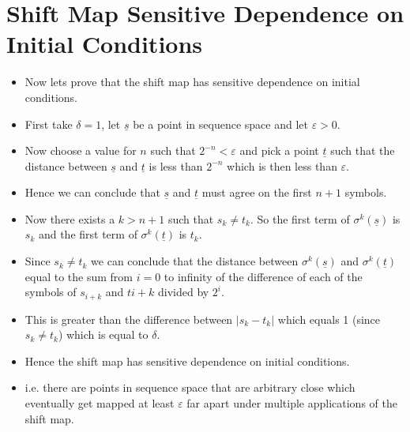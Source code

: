 \documentclass{article}
\begin{document}
    \section{Shift Map Sensitive Dependence on Initial Conditions}
    \begin{itemize}
        \item Now lets prove that the shift map has sensitive dependence on initial conditions.
        \item First take $\delta = 1$, let $\underline{s}$ be a point in sequence space and let $\varepsilon > 0$.
        \item Now choose a value for $n$ such that $2^{-n} < \varepsilon$ and pick a point $\underline{t}$ such that the distance between $\underline{s}$ and $\underline{t}$ is less than $2^{-n}$ which is then less than $\varepsilon$.
        \item Hence we can conclude that $\underline{s}$ and $\underline{t}$ must agree on the first $n+1$ symbols.
        \item Now there exists a $k > n + 1$ such that $s_k \neq t_k$. So the first term of $\sigma^k(\underline{s})$ is $s_k$ and the first term of $\sigma^k(\underline{t})$ is $t_k$.
        \item Since $s_k \neq t_k$ we can conclude that the distance between $\sigma^k(\underline{s})$ and $\sigma^k(\underline{t})$ equal to the sum from $i = 0$ to infinity of the difference of each of the symbols of $s_{i+k}$ and $t{i+k}$ divided by $2^i$. \item This is greater than the difference between $|s_k - t_k|$ which equals 1 (since $s_k \neq t_k$) which is equal to $\delta$.
        \item Hence the shift map has sensitive dependence on initial conditions.
        \item i.e. there are points in sequence space that are arbitrary close which eventually get mapped at least $\varepsilon$ far apart under multiple applications of the shift map.
    \end{itemize}
\end{document}
